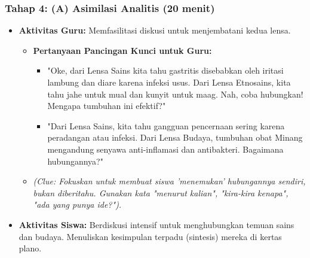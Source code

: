 \documentclass[a4paper,12pt]{article}
\begin{document}
\subsubsection{Tahap 4: (A) Asimilasi Analitis (20 menit)}
\begin{itemize}
\item \textbf{Aktivitas Guru:} Memfasilitasi diskusi untuk menjembatani kedua lensa.
    \begin{itemize}
    \item \textbf{Pertanyaan Pancingan Kunci untuk Guru:}
        \begin{itemize}
        \item "Oke, dari Lensa Sains kita tahu gastritis disebabkan oleh iritasi lambung dan diare karena infeksi usus. Dari Lensa Etnosains, kita tahu jahe untuk mual dan kunyit untuk maag. Nah, coba hubungkan! Mengapa tumbuhan ini efektif?"
        \item "Dari Lensa Sains, kita tahu gangguan pencernaan sering karena peradangan atau infeksi. Dari Lensa Budaya, tumbuhan obat Minang mengandung senyawa anti-inflamasi dan antibakteri. Bagaimana hubungannya?"
        \end{itemize}
    \item \textit{(Clue: Fokuskan untuk membuat siswa 'menemukan' hubungannya sendiri, bukan diberitahu. Gunakan kata "menurut kalian", "kira-kira kenapa", "ada yang punya ide?").}
    \end{itemize}
\item \textbf{Aktivitas Siswa:} Berdiskusi intensif untuk menghubungkan temuan sains dan budaya. Menuliskan kesimpulan terpadu (sintesis) mereka di kertas plano.
\end{itemize}
\end{document}
